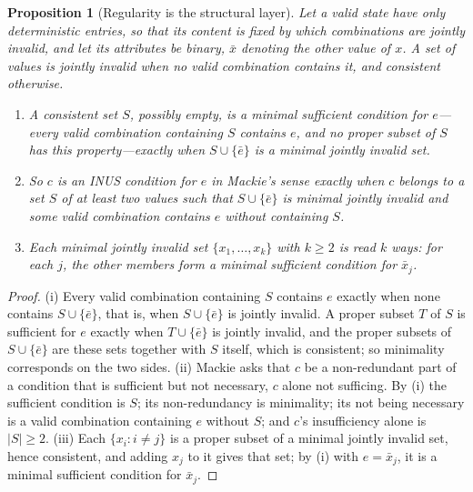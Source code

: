\documentclass[11pt]{article}
\newtheorem{proposition}{Proposition}
\begin{document}
\begin{proposition}[Regularity is the structural layer]
\label{prop:regularity}
Let a valid state have only deterministic entries, so that its content is fixed by which combinations are jointly invalid, and let its attributes be binary, $\bar{x}$ denoting the other value of $x$. A set of values is \emph{jointly invalid} when no valid combination contains it, and \emph{consistent} otherwise.
\begin{enumerate}
\item[(i)] A consistent set $S$, possibly empty, is a minimal sufficient condition for $e$---every valid combination containing $S$ contains $e$, and no proper subset of $S$ has this property---exactly when $S \cup \{\bar{e}\}$ is a minimal jointly invalid set.
\item[(ii)] So $c$ is an INUS condition for $e$ in Mackie's sense exactly when $c$ belongs to a set $S$ of at least two values such that $S \cup \{\bar{e}\}$ is minimal jointly invalid and some valid combination contains $e$ without containing $S$.
\item[(iii)] Each minimal jointly invalid set $\{x_1, \ldots, x_k\}$ with $k \ge 2$ is read $k$ ways: for each $j$, the other members form a minimal sufficient condition for $\bar{x}_j$.
\end{enumerate}
\end{proposition}
\begin{proof}
(i) Every valid combination containing $S$ contains $e$ exactly when none contains $S \cup \{\bar{e}\}$, that is, when $S \cup \{\bar{e}\}$ is jointly invalid. A proper subset $T$ of $S$ is sufficient for $e$ exactly when $T \cup \{\bar{e}\}$ is jointly invalid, and the proper subsets of $S \cup \{\bar{e}\}$ are these sets together with $S$ itself, which is consistent; so minimality corresponds on the two sides. (ii) Mackie asks that $c$ be a non-redundant part of a condition that is sufficient but not necessary, $c$ alone not sufficing. By (i) the sufficient condition is $S$; its non-redundancy is minimality; its not being necessary is a valid combination containing $e$ without $S$; and $c$'s insufficiency alone is $|S| \ge 2$. (iii) Each $\{x_i : i \ne j\}$ is a proper subset of a minimal jointly invalid set, hence consistent, and adding $x_j$ to it gives that set; by (i) with $e = \bar{x}_j$, it is a minimal sufficient condition for $\bar{x}_j$.
\end{proof}
\end{document}
